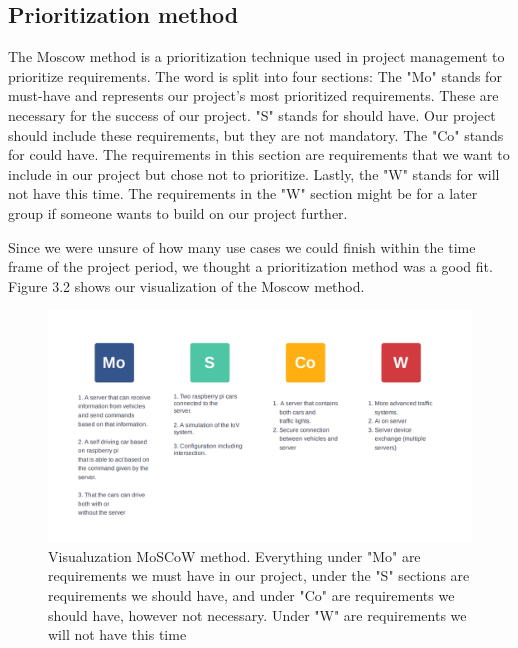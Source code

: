 \subsection{Prioritization method}
The Moscow method is a prioritization technique used in project management to prioritize requirements. The word is split into four sections: The "Mo" stands for must-have and represents our project's most prioritized requirements. These are necessary for the success of our project. "S" stands for should have. Our project should include these requirements, but they are not mandatory. The "Co" stands for could have. The requirements in this section are requirements that we want to include in our project but chose not to prioritize. Lastly, the "W" stands for will not have this time. The requirements in the "W" section might be for a later group if someone wants to build on our project further.

Since we were unsure of how many use cases we could finish within the time frame of the project period, we thought a prioritization method was a good fit. Figure 3.2 shows our visualization of the Moscow method.

\begin{figure}[h!]
	\centering
	\includegraphics[width=1\linewidth]{figures/MosCoW_method}
	\caption[MosCoW method]{Visualuzation MoSCoW method. Everything under "Mo" are requirements we must have in our project, under the "S" sections are requirements we should have, and under "Co" are requirements we should have, however not necessary. Under "W" are requirements we will not have this time}
	\label{fig:moscowmethod}
\end{figure}


